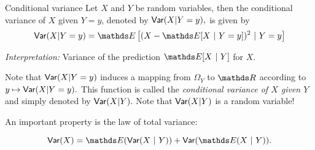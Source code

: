 \begin{frame}[t]{Conditional variance} 
	Let $X$ and $Y$ be random variables, then the conditional variance of $X$ given $Y=y$, denoted by $\mathsf{Var}(X|Y=y),$ is given by
	$$	\var(X|Y=y)  = \E \left[ (X - \E[X~|~Y=y])^2  ~|~ Y=y  \right]	$$
	
	\emph{Interpretation:} Variance of the prediction $\E[X~|~Y]$ for $X.$
	\lz
	
	Note that $\mathsf{Var}(X|Y=y)$ induces a mapping from $\Omega_Y$ to $\R$ according to $y \mapsto \mathsf{Var}(X|Y=y).$
	This function is called the \emph{conditional variance of $X$ given $Y$} and simply denoted by $\mathsf{Var}(X|Y).$
	Note that $\mathsf{Var}(X|Y)$ is a random variable!
	
	\lz
	
	An important property is the law of total variance:
	
	$$  \var(X) = \E(\var(X~|~Y)) + \var(\E(X~|~Y)).  $$

	
\end{frame}




\endlecture

 
